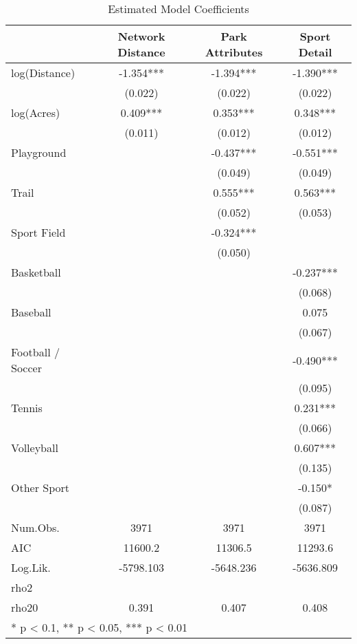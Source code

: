 \documentclass[]{elsarticle} %
\begin{document}
\begin{table}

\caption{\label{tab:base-modelsummary}Estimated Model Coefficients}
\centering
\begin{tabular}[t]{lccc}
\toprule
  & Network Distance & Park Attributes & Sport Detail\\
\midrule
log(Distance) & -1.354*** & -1.394*** & -1.390***\\
 & (0.022) & (0.022) & (0.022)\\
log(Acres) & 0.409*** & 0.353*** & 0.348***\\
 & (0.011) & (0.012) & (0.012)\\
Playground &  & -0.437*** & -0.551***\\
 &  & (0.049) & (0.049)\\
Trail &  & 0.555*** & 0.563***\\
 &  & (0.052) & (0.053)\\
Sport Field &  & -0.324*** & \\
 &  & (0.050) & \\
Basketball &  &  & -0.237***\\
 &  &  & (0.068)\\
Baseball &  &  & 0.075\\
 &  &  & (0.067)\\
Football / Soccer &  &  & -0.490***\\
 &  &  & (0.095)\\
Tennis &  &  & 0.231***\\
 &  &  & (0.066)\\
Volleyball &  &  & 0.607***\\
 &  &  & (0.135)\\
Other Sport &  &  & -0.150*\\
 &  &  & (0.087)\\
\midrule
Num.Obs. & 3971 & 3971 & 3971\\
AIC & 11600.2 & 11306.5 & 11293.6\\
Log.Lik. & -5798.103 & -5648.236 & -5636.809\\
rho2 &  &  & \\
rho20 & 0.391 & 0.407 & 0.408\\
\bottomrule
\multicolumn{4}{l}{\textsuperscript{} * p < 0.1, ** p < 0.05, *** p < 0.01}\\
\end{tabular}
\end{table}
\end{document}
